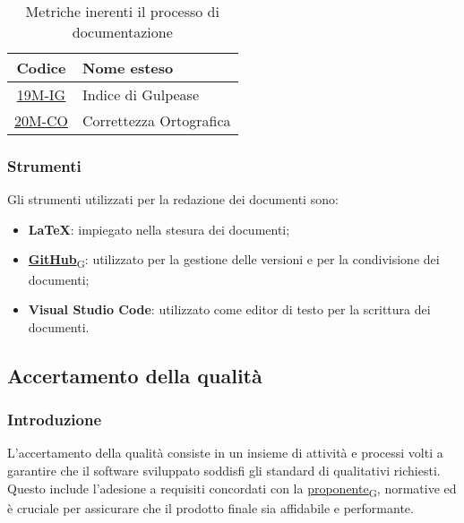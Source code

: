 \begin{table}[!h]
	\centering
	\begin{tabular}{|c|l|}
		\hline
		\textbf{Codice} & \textbf{Nome esteso}               					\\
		\hline
		\underline{\hyperlink{19M}{19M-IG}}     & Indice di Gulpease   			\\
		\underline{\hyperlink{20M}{20M-CO}}     & Correttezza Ortografica  		\\
		\hline
	\end{tabular}
	\caption{Metriche inerenti il processo di documentazione}
\end{table}

\subsubsection{Strumenti}
Gli strumenti utilizzati per la redazione dei documenti sono:
\begin{itemize}
	\item \textbf{LaTeX}: impiegato nella stesura dei documenti;
	\item \href{https://7last.github.io/docs/rtb/documentazione-interna/glossario\#github}{\textbf{GitHub}\textsubscript{G}}: utilizzato per la gestione delle versioni e per la condivisione dei documenti;
	\item \textbf{Visual Studio Code}: utilizzato come editor di testo per la scrittura dei documenti.
\end{itemize}



\subsection{Accertamento della qualità}
\subsubsection{Introduzione}
L'accertamento della qualità consiste in un insieme di attività e processi volti a garantire che il software sviluppato soddisfi gli standard di qualitativi richiesti. Questo include l'adesione a requisiti concordati con la \href{https://7last.github.io/docs/rtb/documentazione-interna/glossario\#proponente}{proponente\textsubscript{G}}, normative ed è cruciale per assicurare che il prodotto finale sia affidabile e performante.

